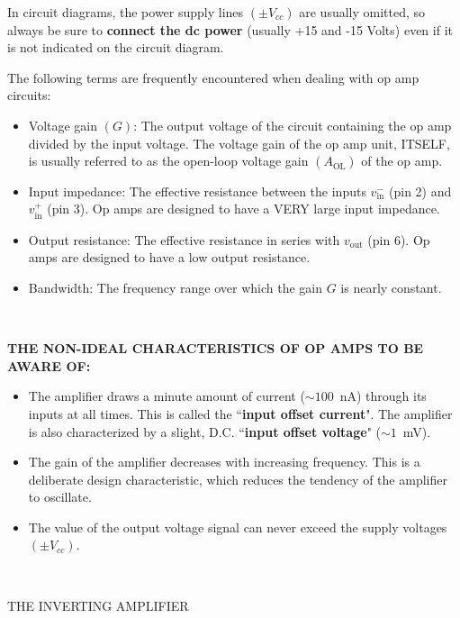 \documentclass[12pt,oneside,openany,letterpaper]{article}
\begin{document}
\noindent In circuit diagrams, the power supply lines $(\pm V_{cc})$ are usually omitted, so always be sure to {\bf connect the dc power} (usually +15 and -15 Volts) even if it is not indicated on the circuit diagram. 

\clearpage

The following terms are frequently encountered when dealing with op amp circuits:
\begin{itemize}
\item Voltage gain $(G)$:  The output voltage of the circuit containing the op amp divided by the input voltage.  The voltage gain of the op amp unit, ITSELF, is usually referred to as the open-loop voltage gain $(A_\mathrm{OL})$ of the op amp. 
\item Input impedance: The effective resistance between the inputs $v_\mathrm{in}^-$ (pin 2) and $v_\mathrm{in}^+$ (pin 3).  Op amps are designed to have a VERY large input impedance. 
\item Output resistance: The effective resistance in series with $v_\mathrm{out}$ (pin 6).  Op amps are designed to have a low output resistance. 
\item	Bandwidth: The frequency range over which the gain $G$ is nearly constant. 
\end{itemize}

~

{\bf THE NON-IDEAL CHARACTERISTICS OF OP AMPS TO BE AWARE OF:}
\begin{itemize}
\item The amplifier draws a minute amount of current ($\sim 100$~nA) through its inputs at all times.  This is called the ``{\bf input offset current}".  The amplifier is also characterized by a slight, D.C. ``{\bf input offset voltage}" ($\sim 1$~mV). 
\item The gain of the amplifier decreases with increasing frequency. This is a deliberate design characteristic, which reduces the tendency of the amplifier to oscillate. 
\item The value of the output voltage signal can never exceed the supply voltages $(\pm V_{cc})$.
\end{itemize}

~

\noindent THE INVERTING AMPLIFIER

~
\end{document}
